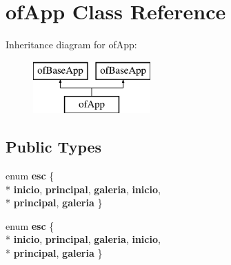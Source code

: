 \hypertarget{classof_app}{}\section{of\+App Class Reference}
\label{classof_app}
Inheritance diagram for of\+App\+:\begin{figure}[H]
\begin{center}
\leavevmode
\includegraphics[height=2.000000cm]{classof_app}
\end{center}
\end{figure}
\subsection*{Public Types}
\begin{DoxyCompactItemize}
\item 
\hypertarget{classof_app_a1fa510985ab814a37d2a8cec474ef31f}{}enum {\bfseries esc} \{ \\*
{\bfseries inicio}, 
{\bfseries principal}, 
{\bfseries galeria}, 
{\bfseries inicio}, 
\\*
{\bfseries principal}, 
{\bfseries galeria}
 \}\label{classof_app_a1fa510985ab814a37d2a8cec474ef31f}

\item 
\hypertarget{classof_app_a1fa510985ab814a37d2a8cec474ef31f}{}enum {\bfseries esc} \{ \\*
{\bfseries inicio}, 
{\bfseries principal}, 
{\bfseries galeria}, 
{\bfseries inicio}, 
\\*
{\bfseries principal}, 
{\bfseries galeria}
 \}\label{classof_app_a1fa510985ab814a37d2a8cec474ef31f}

\end{DoxyCompactItemize}
